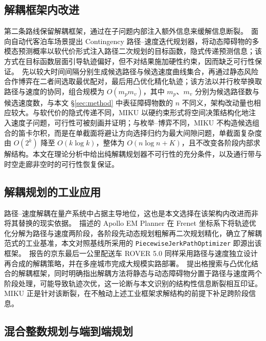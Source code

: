 \documentclass[a4paper,11pt]{ctexart}
\theoremstyle{definition}
\begin{document}
\subsection{解耦框架内改进}
\label{sec:related-decoupled}

第二条路线保留解耦框架，通过在子问题内部注入额外信息来缓解信息断裂。\citet{han2026_contingency}~面向自动代客泊车场景提出 Contingency 路径--速度迭代规划器，将动态障碍物的多模态预测概率以软代价形式注入路径二次规划的目标函数，隐式传递预测信息；该方式在目标函数层面引导轨迹偏好，但不对结果施加硬性约束，因而缺乏可行性保证。\citet{zhang2023_dp_rcg}~先以较大时间间隔分别生成候选路径与候选速度曲线集合，再通过静态风险合作博弈在二者间选取最优配对，最后用凸优化精化轨迹；该方法以并行枚举换取路径与速度的协同，组合规模为 $O(m_p m_v)$，其中 $m_p$、$m_v$ 分别为候选路径数与候选速度数，与本文 §\ref{sec:method} 中表征障碍物数的 $n$ 不同义，架构改动量也相应较大。与软代价的隐式传递不同，MIKU 以硬约束形式将空间决策结构化地注入速度子问题，可行性可被刻画并证明；与枚举--博弈不同，MIKU 不构造候选组合的笛卡尔积，而是在单截面将避让方向选择归约为最大间隙问题，单截面复杂度由 $O(2^k)$ 降至 $O(k\log k)$，整体为 $O(n\log n + K)$，且不改变各阶段内部求解结构。本文在理论分析中给出纯解耦规划器不可行性的充分条件，以及通行带与时空走廊非空时的可行性恢复保证。

\subsection{解耦规划的工业应用}
\label{sec:related-industrial}

路径--速度解耦在量产系统中占据主导地位，这也是本文选择在该架构内改进而非将其替换的现实依据。\citet{fan2018baidu}~描述的 Apollo EM Planner 在 Frenet 坐标系下将轨迹优化分解为路径与速度两阶段，各阶段先动态规划粗解再二次规划精化，确立了解耦范式的工业基准，本文对照基线所采用的 \texttt{PiecewiseJerkPathOptimizer} 即源出该框架。\citet{wang2022_jfr}~报告的京东最后一公里配送车 ROVER 5.0 同样采用路径与速度独立设计再合成的解耦策略，并在多座城市完成大规模实路部署。\citet{meng2019_access}~提出格搜索与凸优化结合的解耦框架，同时明确指出解耦方法将静态与动态障碍物分置于路径与速度两个阶段处理，可能导致轨迹次优，这一论断与本文识别的结构性信息断裂相互印证。MIKU 正是针对该断裂，在不触动上述工业框架求解结构的前提下补足跨阶段信息。

\subsection{混合整数规划与端到端规划}
\label{sec:related-supplement}
\end{document}
